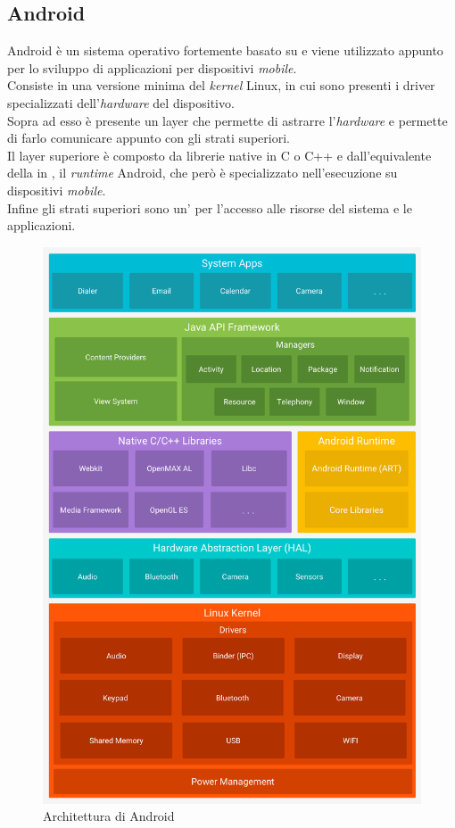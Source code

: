     \subsection{Android}
      Android è un sistema operativo fortemente basato su  e viene utilizzato appunto per lo sviluppo di applicazioni per dispositivi \textit{mobile}.\\
      Consiste in una versione minima del \textit{kernel} Linux, in cui sono presenti i driver specializzati dell'\textit{hardware} del dispositivo.\\
      Sopra ad esso è presente un layer che permette di astrarre l'\textit{hardware} e permette di farlo comunicare appunto con gli strati superiori.\\
      Il layer superiore è composto da librerie native in C o C++ e dall'equivalente della  in , il \textit{runtime} Android, che però è specializzato nell'esecuzione su dispositivi \textit{mobile}.\\
      Infine gli strati superiori sono un' per l'accesso alle risorse del sistema e le applicazioni.
      \begin{figure}[h]
        \centering
        \includegraphics[scale=0.11]{immagini/android.png}
        \caption{Architettura di Android}
        \label{android}
      \end{figure}
    \newpage
